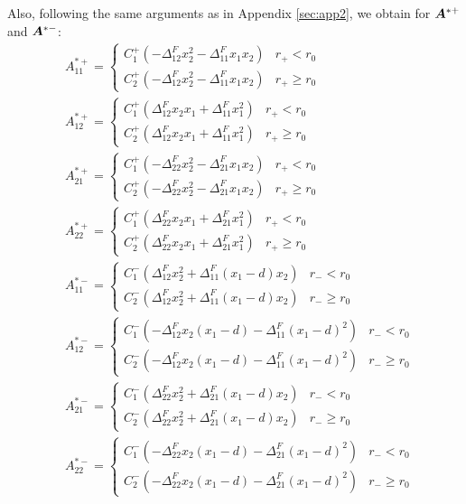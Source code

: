 \documentclass[11pt,letterpaper]{article}
\begin{document}
Also, following the same arguments as in Appendix \ref{sec:app2}, we obtain for $\bfA^{*+}$ and $\bfA^{*-}$:
\begin{eqnarray*}
&A^{*+}_{11}  = 
\begin{cases}
 C_1^+ \left(-\Delta^F_{12} x_2^2-\Delta^F_{11} x_1 x_2 \right)  &r_+ < r_0 \\
C_2^+ \left(-\Delta^F_{12} x_2^2 - \Delta^F_{11} x_1 x_2 \right)  & r_+ \ge r_0
\end{cases}
\\
&A^{*+}_{12}  = 
\begin{cases}
C_1^+ \left(\Delta^F_{12} x_2 x_1 + \Delta^F_{11} x_1^2\right)  &r_+ < r_0 \\
C_2^+ \left(\Delta^F_{12} x_2 x_1 + \Delta^F_{11} x_1^2\right)& r_+ \ge r_0
\end{cases}
\\
&A^{*+}_{21}  = 
\begin{cases}
 C_1^+ \left(-\Delta^F_{22} x_2^2-\Delta^F_{21} x_1 x_2\right)  &r_+ < r_0 \\
C_2^+ \left(-\Delta^F_{22} x_2^2 - \Delta^F_{21} x_1 x_2\right) & r_+ \ge r_0
\end{cases}
\\
&A^{*+}_{22}  = 
\begin{cases}
C_1^+ \left(\Delta^F_{22} x_2 x_1 + \Delta^F_{21} x_1^2\right) &r_+ < r_0 \\
C_2^+ \left(\Delta^F_{22} x_2 x_1 + \Delta^F_{21} x_1^2\right) & r_+ \ge r_0
\end{cases}
\\&A^{*-}_{11}  = 
\begin{cases}
 C_1^- \left(\Delta^F_{12} x_2^2+\Delta^F_{11} (x_1-d) x_2 \right)  &r_- < r_0 \\
C_2^- \left(\Delta^F_{12} x_2^2 + \Delta^F_{11} (x_1-d) x_2 \right)  & r_- \ge r_0
\end{cases}
\\
&A^{*-}_{12}  = 
\begin{cases}
C_1^- \left(-\Delta^F_{12} x_2 (x_1-d) - \Delta^F_{11} (x_1-d)^2\right)  &r_- < r_0 \\
C_2^- \left(-\Delta^F_{12} x_2 (x_1-d) - \Delta^F_{11} (x_1-d)^2\right)& r_- \ge r_0
\end{cases}
\\
&A^{*-}_{21}  = 
\begin{cases}
 C_1^- \left(\Delta^F_{22} x_2^2 + \Delta^F_{21} (x_1-d) x_2\right)  &r_- < r_0 \\
C_2^- \left(\Delta^F_{22} x_2^2 + \Delta^F_{21} (x_1-d) x_2\right) & r_- \ge r_0
\end{cases}
\\
&A^{*-}_{22}  = 
\begin{cases}
C_1^- \left(-\Delta^F_{22} x_2 (x_1-d) - \Delta^F_{21} (x_1-d)^2\right) &r_- < r_0 \\
C_2^- \left(-\Delta^F_{22} x_2 (x_1-d) - \Delta^F_{21} (x_1-d)^2\right) & r_- \ge r_0
\end{cases}
\end{eqnarray*}
\end{document}
